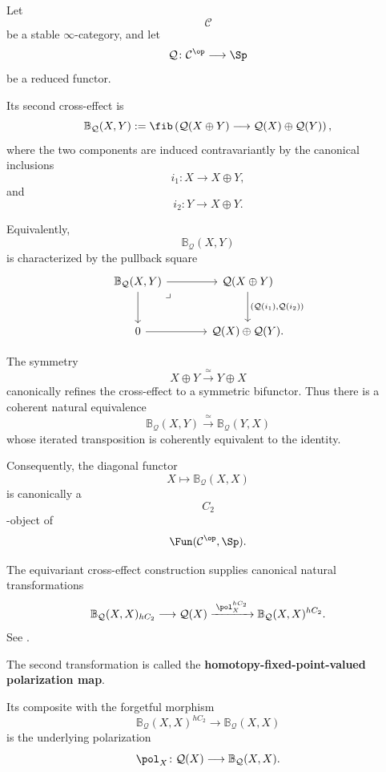 \begin{definition}
\label{def:cross-effect-and-polarization}
Let
\[
    \mathcal C
\]
be a stable $\infty$-category, and let
\[
    \mathcal Q
    \colon
    \mathcal C^{\op}
    \longrightarrow
    \Sp
\]
be a reduced functor.

Its second cross-effect is
\[
    \mathbb B_{\mathcal Q}(X,Y)
    :=
    \fib
    \left(
        \mathcal Q(X\oplus Y)
        \longrightarrow
        \mathcal Q(X)\oplus\mathcal Q(Y)
    \right),
\]
where the two components are induced contravariantly by the canonical
inclusions
\[
    i_1
    \colon
    X
    \longrightarrow
    X\oplus Y,
\]
and
\[
    i_2
    \colon
    Y
    \longrightarrow
    X\oplus Y.
\]

Equivalently,
\[
    \mathbb B_{\mathcal Q}(X,Y)
\]
is characterized by the pullback square
\[
\begin{tikzcd}[row sep=large, column sep=large]
    \mathbb B_{\mathcal Q}(X,Y)
        \arrow[r]
        \arrow[d]
        \arrow[dr, phantom, very near start, "\lrcorner"]
    &
    \mathcal Q(X\oplus Y)
        \arrow[d, "{(\mathcal Q(i_1),\mathcal Q(i_2))}"]
    \\
    0
        \arrow[r]
    &
    \mathcal Q(X)\oplus\mathcal Q(Y).
\end{tikzcd}
\]

The symmetry
\[
    X\oplus Y
    \xrightarrow{\;\simeq\;}
    Y\oplus X
\]
canonically refines the cross-effect to a symmetric bifunctor. Thus there
is a coherent natural equivalence
\[
    \mathbb B_{\mathcal Q}(X,Y)
    \xrightarrow{\;\simeq\;}
    \mathbb B_{\mathcal Q}(Y,X)
\]
whose iterated transposition is coherently equivalent to the identity.

Consequently, the diagonal functor
\[
    X
    \longmapsto
    \mathbb B_{\mathcal Q}(X,X)
\]
is canonically a
\[
    C_2
\]
-object of
\[
    \Fun(\mathcal C^{\op},\Sp).
\]

The equivariant cross-effect construction supplies canonical natural
transformations
\[
    \mathbb B_{\mathcal Q}(X,X)_{hC_2}
    \longrightarrow
    \mathcal Q(X)
    \xrightarrow{\;\pol_X^{hC_2}\;}
    \mathbb B_{\mathcal Q}(X,X)^{hC_2}.
\]
See
\cite[Lemmas~1.1.9--1.1.10]{CalmesDottoHarpazEtAl}.

The second transformation is called the
\textbf{homotopy-fixed-point-valued polarization map}.

Its composite with the forgetful morphism
\[
    \mathbb B_{\mathcal Q}(X,X)^{hC_2}
    \longrightarrow
    \mathbb B_{\mathcal Q}(X,X)
\]
is the underlying polarization
\[
    \pol_X
    \colon
    \mathcal Q(X)
    \longrightarrow
    \mathbb B_{\mathcal Q}(X,X).
\]


\end{definition}

